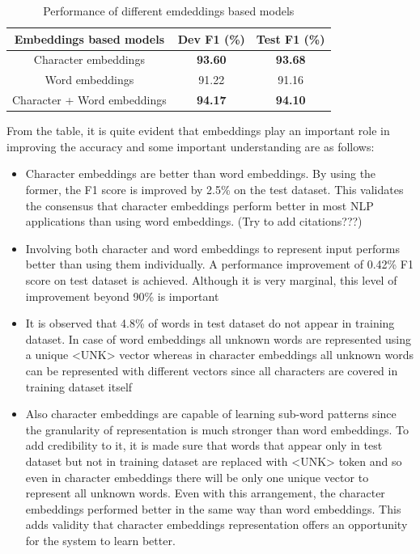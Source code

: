 \documentclass[a4paper, 11pt]{article}
\begin{document}
\begin{table}[h!]
  \begin{center}
    \label{tab:different_embeddings_model}
    \def\arraystretch{1.5}%
    \begin{tabular}{c|c|c}
      Embeddings based models & Dev F1 (\%) & Test F1 (\%) \\
      \hline
      Character embeddings & \textbf{93.60} & \textbf{93.68}\\
      Word embeddings  & 91.22 & 91.16\\
      Character + Word embeddings & \textbf{94.17} & \textbf{94.10}\\
    \end{tabular}
    \caption{Performance of different emdeddings based models }
  \end{center}
\end{table}


From the table, it is quite evident that embeddings play an important role in improving the accuracy and some important understanding are as follows:
\begin{itemize}
\item Character embeddings are better than word embeddings. By using the former, the F1 score is improved by 2.5\% on the test dataset. This validates the consensus that character embeddings perform better in most NLP applications than using word embeddings. (Try to add citations???)
\item Involving both character and word embeddings to represent input performs better than using them individually. A performance improvement of 0.42\% F1 score on test dataset is achieved. Although it is very marginal, this level of improvement beyond 90\% is important
\item It is observed that 4.8\% of words in test dataset do not appear in training dataset. In case of word embeddings all unknown words are represented using a unique <UNK> vector whereas in character embeddings all unknown words can be represented with different vectors since all characters are covered in training dataset itself
\item Also character embeddings are capable of learning sub-word patterns since the granularity of representation is much stronger than word embeddings. To add credibility to it, it is made sure that words that appear only in test dataset but not in training dataset are replaced with <UNK> token and so even in character embeddings there will be only one unique vector to represent all unknown words. Even with this arrangement, the character embeddings performed better in the same way than word embeddings. This adds validity that character embeddings representation offers an opportunity for the system to learn better. 
\end{itemize}
\end{document}
